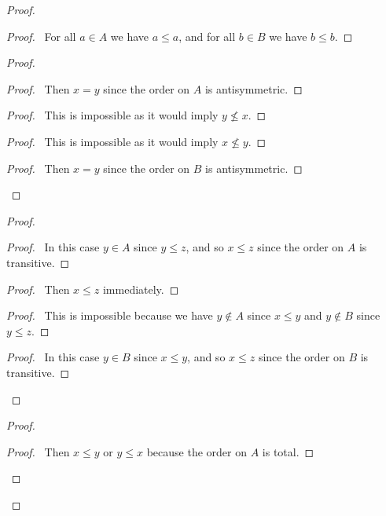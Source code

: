 \documentclass{book}
\theoremstyle{definition}
\begin{document}
\begin{proof}
\pf
{}
\begin{proof}
	\pf\ For all $a \in A$ we have $a \leq a$, and for all $b \in B$ we have $b \leq b$.
\end{proof}
\begin{proof}
	\begin{proof}
		\pf\ Then $x = y$ since the order on $A$ is antisymmetric.
	\end{proof}
	\begin{proof}
		\pf\ This is impossible as it would imply $y \not\leq x$.
	\end{proof}
	\begin{proof}
		\pf\ This is impossible as it would imply $x \not\leq y$.
	\end{proof}
	\begin{proof}
		\pf\ Then $x = y$ since the order on $B$ is antisymmetric.
	\end{proof}
\end{proof}
\begin{proof}
	\begin{proof}
		\pf\ In this case $y \in A$ since $y \leq z$, and so $x \leq z$ since the order on $A$ is transitive.
	\end{proof}
	\begin{proof}
		\pf\ Then $x \leq z$ immediately.
	\end{proof}
	\begin{proof}
		\pf\ This is impossible because we have $y \notin A$ since $x \leq y$ and $y \notin B$ since $y \leq z$.
	\end{proof}
	\begin{proof}
		\pf\ In this case $y \in B$ since $x \leq y$, and so $x \leq z$ since the order on $B$ is transitive.
	\end{proof}
\end{proof}
\begin{proof}
	\begin{proof}
		\pf\ Then $x \leq y$ or $y \leq x$ because the order on $A$ is total.

\end{proof}
\end{proof}
\end{proof}
\end{document}
